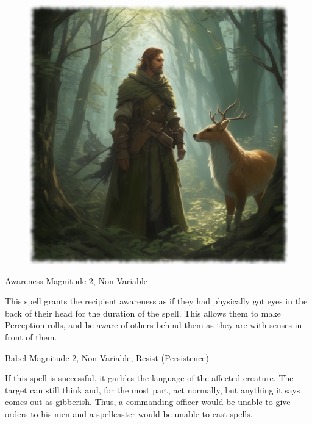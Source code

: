 \begin{figure}[h]
\begin{center}
\includegraphics[scale=0.24]{img/ai-images/animal-whisperer.png}
\end{center}
\end{figure}

%

\begin{rpg-spell}
{Awareness} %
{Magnitude 2, Non-Variable}

This spell grants the recipient awareness as if they had physically got eyes in the back of their head for the duration of the spell. This allows them to make Perception rolls, and be aware of others behind them as they are with senses in front of them.
\end{rpg-spell}



\begin{rpg-spell}
{Babel}
{Magnitude 2, Non-Variable, Resist (Persistence)}

If this spell is successful, it garbles the language of the affected creature. The target can still think and, for the most part, act normally, but anything it says comes out as gibberish. Thus, a commanding officer would be unable to give orders to his men and a spellcaster would be unable to cast spells.
\end{rpg-spell}



